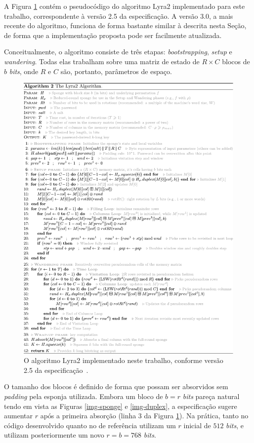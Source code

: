 \documentclass{article}
\begin{document}
A Figura \ref{lyra2-alg} contém o pseudocódigo do algoritmo Lyra2 implementado
para este trabalho, correspondente à versão 2.5 da especificação. A versão 3.0,
a mais recente do algoritmo, funciona de forma bastante similar à descrita
nesta Seção, de forma que a implementação proposta pode ser facilmente
atualizada.

Conceitualmente, o algoritmo consiste de três etapas: \emph{bootstrapping},
\emph{setup} e \emph{wandering}. Todas elas trabalham sobre uma matriz
de estado de $R \times C$ blocos de $b$ \emph{bits}, onde $R$ e $C$
são, portanto, parâmetros de espaço.

\begin{figure}[htbp]
\centering
\includegraphics[width=\linewidth]{./img/spec.pdf}
\caption{O algoritmo Lyra2 implementado neste trabalho\label{lyra2-alg}, conforme versão 2.5 da especificação~\cite{lyra2-spec}.}
\end{figure}

O tamanho dos blocos é definido de forma que possam ser absorvidos sem
\emph{padding} pela esponja utilizada. Embora um bloco de $b = r$ \emph{bits}
pareça natural tendo em vista as Figuras \ref{img-sponge} e
\ref{img-duplex}, a especificação sugere aumentar $r$ após a primeira
absorção (linha 3 da Figura \ref{lyra2-alg}). Na prática, tanto no
código desenvolvido quanto no de referência utilizam um $r$ inicial de $512$ \emph{bits},
e utilizam posteriormente um novo $r = b = 768$ \emph{bits}.
\end{document}
